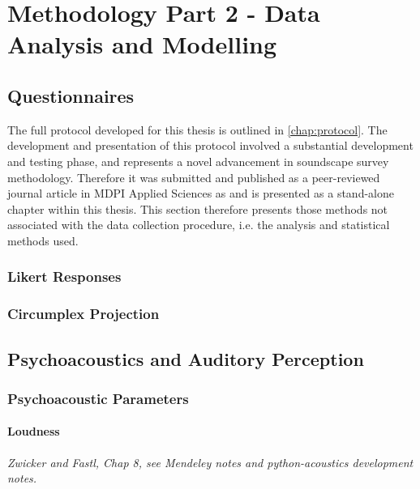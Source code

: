 \chapter{Methodology Part 2 - Data Analysis and Modelling}
\label{chap:methods}





\section{Questionnaires}

 The full protocol developed for this thesis is outlined in \cref{chap:protocol}. The development and presentation of this protocol involved a substantial development and testing phase, and represents a novel advancement in soundscape survey methodology. Therefore it was submitted and published as a peer-reviewed journal article in MDPI Applied Sciences as \citet{Mitchell2020Soundscape} and is presented as a stand-alone chapter within this thesis. This section therefore presents those methods not associated with the data collection procedure, i.e. the analysis and statistical methods used.

 \subsection{Likert Responses}

 \subsection{Circumplex Projection}

\section{Psychoacoustics and Auditory Perception}

 \subsection{Psychoacoustic Parameters}

   \subsubsection{Loudness}
   \emph{Zwicker and Fastl, Chap 8, see Mendeley notes and python-acoustics development notes.}

